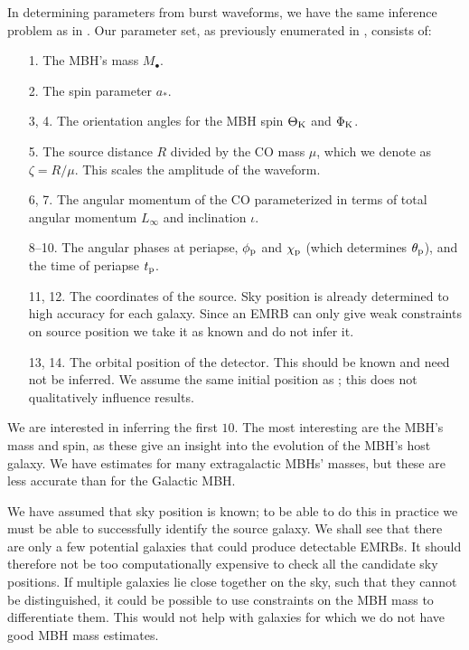 In determining parameters from burst waveforms, we have the same inference problem as in . Our parameter set, as previously enumerated in , consists of:
\begin{enumerate}[leftmargin=*, widest=\:88--88.]
\item[1.] The MBH's mass $M_\bullet$.
\item[2.] The spin parameter $a_\ast$.
\item[3, 4.] The orientation angles for the MBH spin $\Theta_\mathrm{K}$ and $\Phi_\mathrm{K}$.
\item[5.] The source distance $R$ divided by the CO mass $\mu$, which we denote as $\zeta = R/\mu$. This scales the amplitude of the waveform.
\item[6, 7.] The angular momentum of the CO parameterized in terms of total angular momentum $L_\infty$ and inclination $\iota$.
\item[8--10.] The angular phases at periapse, $\phi_\mathrm{p}$  and $\chi_\mathrm{p}$ (which determines $\theta_\mathrm{p}$), and the time of periapse $t_\mathrm{p}$.
\item[11, 12.] The coordinates of the source. Sky position is already determined to high accuracy for each galaxy. Since an EMRB can only give weak constraints on source position we take it as known and do not infer it.
\item[13, 14.] The orbital position of the detector. This should be known and need not be inferred. We assume the same initial position as \citet{Cutler1998}; this does not qualitatively influence results.
\end{enumerate}
We are interested in inferring the first $10$. The most interesting are the MBH's mass and spin, as these give an insight into the evolution of the MBH's host galaxy. We have estimates for many extragalactic MBHs' masses, but these are less accurate than for the Galactic MBH.

We have assumed that sky position is known; to be able to do this in practice we must be able to successfully identify the source galaxy. We shall see that there are only a few potential galaxies that could produce detectable EMRBs. It should therefore not be too computationally expensive to check all the candidate sky positions. If multiple galaxies lie close together on the sky, such that they cannot be distinguished, it could be possible to use constraints on the MBH mass to differentiate them. This would not help with galaxies for which we do not have good MBH mass estimates.

